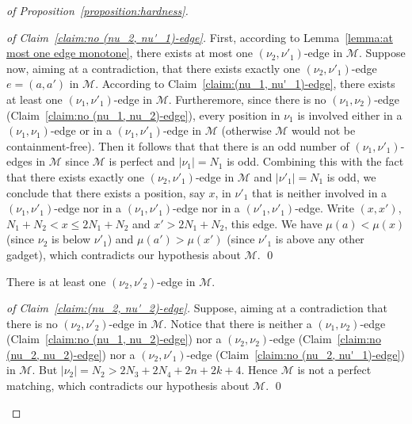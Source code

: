\begin{proof}[of Proposition~\ref{proposition:hardness}]
  \begin{proof}[of Claim~\ref{claim:no (nu_2, nu'_1)-edge}]
    First, according to Lemma~\ref{lemma:at most one edge monotone},
    there exists at most one $(\nu_2, \nu'_1)$-edge in $\mathcal{M}$.
    Suppose now, aiming at a contradiction, that there exists
    exactly one $(\nu_2, \nu'_1)$-edge $e = (a, a')$ in $\mathcal{M}$.
    According to Claim~\ref{claim:(nu_1, nu'_1)-edge}, there exists at least
    one $(\nu_1, \nu'_1)$-edge in $\mathcal{M}$.
    Furtheremore, since
    there is no $(\nu_1, \nu_2)$-edge (Claim~\ref{claim:no (nu_1, nu_2)-edge}),
    every position in $\nu_1$ is involved either in a
    $(\nu_1, \nu_1)$-edge or in a $(\nu_1, \nu'_1)$-edge in $\mathcal{M}$
    (otherwise $\mathcal{M}$ would not be containment-free).
    Then it follows that that there is an odd number of $(\nu_1, \nu'_1)$-edges
    in $\mathcal{M}$ since $\mathcal{M}$ is perfect and $|\nu_1| = N_1$ is odd.
    Combining this with the fact that there exists exactly one $(\nu_2, \nu'_1)$-edge
    in $\mathcal{M}$ and $|\nu'_1| = N_1$ is odd,
    we conclude that there exists a position, say $x$, in $\nu'_1$
    that is neither involved in a $(\nu_1, \nu'_1)$-edge nor in a $(\nu_1, \nu'_1)$-edge
    nor in a $(\nu'_1, \nu'_1)$-edge.
    Write $(x, x')$, $N_1+N_2 < x \leq 2N_1 + N_2$ and $x' > 2N_1 + N_2$, this edge.
    We have $\mu(a) < \mu(x)$ (since $\nu_2$ is below $\nu'_1$)
    and $\mu(a') > \mu(x')$ (since $\nu'_1$ is above any other gadget),
    which contradicts our hypothesis about $\mathcal{M}$.
    \qed
  \end{proof}

  \begin{claim}
    \label{claim:(nu_2, nu'_2)-edge}
    There is at least one $(\nu_2, \nu'_2)$-edge in $\mathcal{M}$.
  \end{claim}

  \begin{proof}[of Claim~\ref{claim:(nu_2, nu'_2)-edge}]
    Suppose, aiming at a contradiction that there is no
    $(\nu_2, \nu'_2)$-edge in $\mathcal{M}$.
    Notice that there is neither
    a $(\nu_1, \nu_2)$-edge (Claim~\ref{claim:no (nu_1, nu_2)-edge})
    nor a $(\nu_2, \nu_2)$-edge (Claim~\ref{claim:no (nu_2, nu_2)-edge})
    nor a $(\nu_2, \nu'_1)$-edge (Claim~\ref{claim:no (nu_2, nu'_1)-edge})
    in $\mathcal{M}$.
    But $|\nu_2| = N_2 > 2N_3 + 2N_4 + 2n + 2k +4$.
    Hence $\mathcal{M}$ is not a perfect matching,
    which contradicts our hypothesis about $\mathcal{M}$.
    \qed
  \end{proof}


\end{proof}
